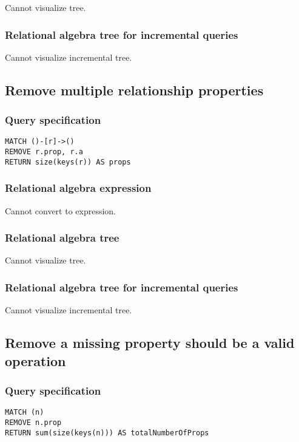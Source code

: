 Cannot visualize tree.

\subsubsection*{Relational algebra tree for incremental queries}

Cannot visualize incremental tree.

\subsection{Remove multiple relationship properties}

\subsubsection*{Query specification}

\begin{lstlisting}
MATCH ()-[r]->()
REMOVE r.prop, r.a
RETURN size(keys(r)) AS props
\end{lstlisting}

\subsubsection*{Relational algebra expression}

Cannot convert to expression.

\subsubsection*{Relational algebra tree}

Cannot visualize tree.

\subsubsection*{Relational algebra tree for incremental queries}

Cannot visualize incremental tree.

\subsection{Remove a missing property should be a valid operation}

\subsubsection*{Query specification}

\begin{lstlisting}
MATCH (n)
REMOVE n.prop
RETURN sum(size(keys(n))) AS totalNumberOfProps
\end{lstlisting}

